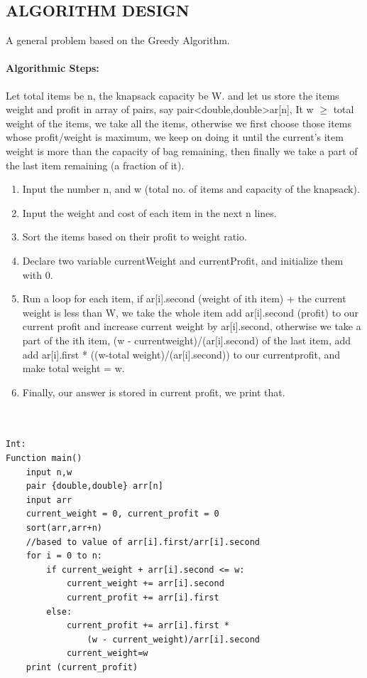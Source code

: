 \documentclass[10pt]{article}
\begin{document}
\begin{multicols*}{2}
\section*{ALGORITHM DESIGN}
A general problem based on the Greedy Algorithm.

\paragraph{Algorithmic Steps:}

Let total items be n, the knapsack capacity be W. and let us store the items weight and profit in array of pairs, say pair<double,double>ar[n], It w $\geq$ total weight of the items, we take all the items, otherwise we first choose those items whose profit/weight is maximum, we keep on doing it until the current's item weight is more than the capacity of bag remaining, then finally we take a part of the last item remaining (a fraction of it).
\begin{enumerate}

\item	Input the number n, and w (total no. of items and capacity of the knapsack).
\item	Input the weight and cost of each item in the next n lines.
\item   Sort the items based on their profit to weight ratio.
\item	Declare two variable currentWeight and currentProfit, and initialize them with 0.
\item	Run a loop for each item, if ar[i].second (weight of ith item) + the current weight is less than W, we take the whole item add ar[i].second (profit) to our current profit and increase current weight by ar[i].second, otherwise we take a part of the ith item, (w - currentweight)/(ar[i].second) of the last item, add add ar[i].first * ((w-total weight)/(ar[i].second)) to our currentprofit, and make total weight = w.
\item	Finally, our answer is stored in current profit, we print that.
\\\
\end{enumerate}


\begin{lstlisting}

Int:
Function main()
    input n,w
    pair {double,double} arr[n]
    input arr
    current_weight = 0, current_profit = 0
    sort(arr,arr+n) 
    //based to value of arr[i].first/arr[i].second
    for i = 0 to n:
        if current_weight + arr[i].second <= w:
            current_weight += arr[i].second
            current_profit += arr[i].first
        else:
            current_profit += arr[i].first * 
                (w - current_weight)/arr[i].second
            current_weight=w
    print (current_profit)


\end{lstlisting}
\end{multicols*}
\end{document}
